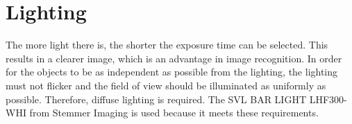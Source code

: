\section{Lighting}
\label{sec:hardware:lighting}

The more light there is, the shorter the exposure time can be selected.
This results in a clearer image, which is an advantage in image recognition.
In order for the objects to be as independent as possible from the lighting, the lighting must not flicker and the field of view should be illuminated as uniformly as possible.
Therefore, diffuse lighting is required.
The SVL BAR LIGHT LHF300-WHI from Stemmer Imaging is used because it meets these requirements.
